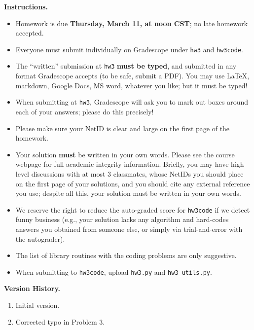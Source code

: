 \noindent\textbf{Instructions.}
\begin{itemize}
    \item
    Homework is due \textbf{Thursday, March 11, at noon CST}; no late homework accepted.
    
    \item
    Everyone must submit individually on Gradescope under \texttt{hw3} and \texttt{hw3code}.
    
    \item
    The ``written'' submission at \texttt{hw3} \textbf{must be typed}, and submitted in
    any format Gradescope accepts (to be safe, submit a PDF).  You may use \LaTeX, markdown,
    Google Docs, MS word, whatever you like; but it must be typed!
    
    \item
    When submitting at \texttt{hw3}, Gradescope will ask you to mark out boxes
    around each of your answers; please do this precisely!
    
    \item
    Please make sure your NetID is clear and large on the first page of the homework.
    
    \item
    Your solution \textbf{must} be written in your own words.
    Please see the course webpage for full academic integrity information.
    Briefly, you may have high-level discussions with at most 3 classmates,
    whose NetIDs you should place on the first page of your solutions,
    and you should cite any external reference you use; despite all this,
    your solution must be written in your own words.
    
    \item
    We reserve the right to reduce the auto-graded score for
    \texttt{hw3code} if we detect funny business (e.g., your solution
    lacks any algorithm and hard-codes answers you obtained from
    someone else, or simply via trial-and-error with the autograder).
    
    \item The list of library routines with the coding problems are only suggestive.
    
    \item
    When submitting to \texttt{hw3code}, upload \texttt{hw3.py} and \texttt{hw3\_utils.py}.
\end{itemize}

\noindent\textbf{Version History.}
\begin{enumerate}
    \item Initial version.
    \item Corrected typo in Problem 3.
\end{enumerate}

